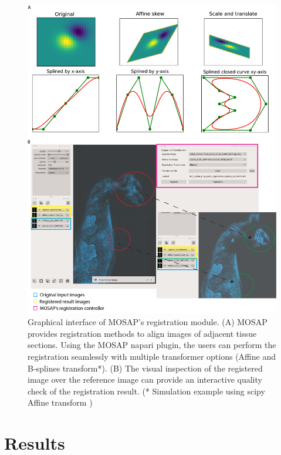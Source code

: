 \begin{figure}
    \centering
    \includegraphics[width=\columnwidth]{Chapter4/Figures/Chapt4_Figure1_registration.png}
    \caption[Graphical interface of MOSAP's registration module]{Graphical interface of MOSAP's registration module. (A) MOSAP provides registration methods to align images of adjacent tissue sections. Using the MOSAP napari plugin, the users can perform the registration seamlessly with multiple transformer options (\ie Affine and B-splines transform*). (B) The visual inspection of the registered image over the reference image can provide an interactive quality check of the registration result. (* Simulation example using scipy Affine transform \cite{SciPy2020NMeth})}
    \label{Chap4:MOSAP_registration}
\end{figure}

\section{Results}

